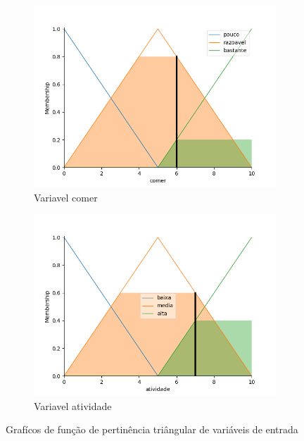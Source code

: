 \documentclass{article}
\begin{document}
\begin{figure}[h!]
  \centering
  \begin{subfigure}[b]{0.4\linewidth}
    \includegraphics[width=\linewidth]{./images/comer-razoavel.png}
    \caption{Variavel comer}
  \end{subfigure}
  \begin{subfigure}[b]{0.4\linewidth}
    \includegraphics[width=\linewidth]{./images/atividade-media-alta.png}
    \caption{Variavel atividade}
  \end{subfigure}
  \caption{Grafícos de função de pertinência triângular de variáveis de entrada}
  \label{fig:triangular-1}
\end{figure}
\end{document}
